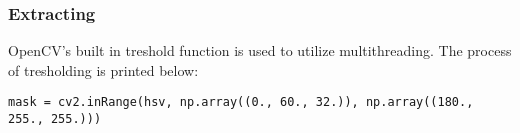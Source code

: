 \subsubsection{Extracting}
OpenCV's built in treshold function is used to utilize multithreading.
The process of tresholding is printed below:
\begin{lstlisting}
mask = cv2.inRange(hsv, np.array((0., 60., 32.)), np.array((180., 255., 255.)))
\end{lstlisting}